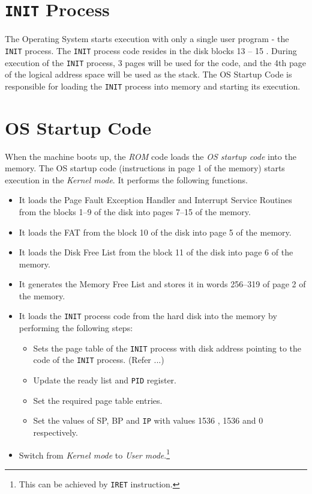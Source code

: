 \documentclass[11pt]{report}
\begin{document}
\section{\texttt{INIT} Process}
\label{lbl:INITprocess}
The Operating System starts execution with only a single user program - the \texttt{INIT} process. The \texttt{INIT} process code resides in the disk blocks 13 -- 15 . During execution of the \texttt{INIT} process, 3 pages will be used for the code, and the 4th page of the logical address space will be used as the stack. The OS Startup Code is responsible for loading the \texttt{INIT} process into memory and starting its execution.


\section{OS Startup Code}
\label{lbl:oscode}
When the machine boots up, the \textit{ROM} code loads the \textit{OS startup code} into the  memory. The OS startup code (instructions in page 1 of the memory) starts execution in the \textit{Kernel mode}. It performs the following functions.
\begin{itemize}
	\item It loads the Page Fault Exception Handler and Interrupt Service Routines from the blocks 1--9 of the disk into pages 7--15 of the memory.
	\item It loads the FAT from the block 10 of the disk into page 5 of the memory.
	\item It loads the Disk Free List from the block 11 of the disk into page 6 of the memory.
	\item It generates the Memory Free List and stores it in words 256--319 of page 2 of the memory.
	\item It loads the \texttt{INIT} process code from the hard disk into the memory by performing the following steps:
	\begin{itemize}
		\item Sets the page table of the \texttt{INIT} process with disk address pointing to the code of the \texttt{INIT} process. (Refer ...)		
		\item Update the ready list and \texttt{PID} register.
		\item Set the required page table entries.
		\item Set the values of SP, BP and \texttt{IP} with values 1536 , 1536 and 0 respectively.
	\end{itemize}
	\item Switch from \textit{Kernel mode} to \textit{User mode}.\footnote{This can be achieved by  \texttt{IRET} instruction.}
\end{itemize}
\end{document}
